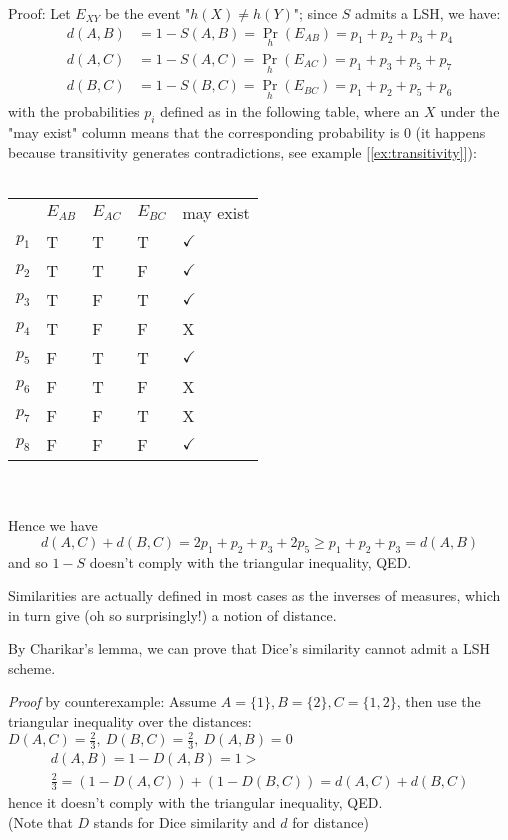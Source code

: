 	\newpage
	Proof: Let $E_{XY}$ be the event "$h(X) \neq h(Y)$"; since $S$ admits a LSH, we have:
	\begin{align*}
		d(A,B) &= 1-S(A,B) = \Pr_h(E_{AB}) = p_1 + p_2 + p_3 + p_4 \\
		d(A,C) &= 1-S(A,C) = \Pr_h(E_{AC}) = p_1 + p_3 + p_5 + p_7 \\
		d(B,C) &= 1-S(B,C) = \Pr_h(E_{BC}) = p_1 + p_2 + p_5 + p_6
	\end{align*}
	with the probabilities $p_i$ defined as in the following table, where an $X$ under the "may exist" column means that the corresponding probability is $0$ (it happens because transitivity generates contradictions, see example [\ref{ex:transitivity}]): \\\\
	\begin{tabular}{lllll}
		& $E_{AB}$ & $E_{AC}$ & $E_{BC}$ & may exist             \\
		$p_1$ & T         & T         & T         & $\checkmark$ \\
		$p_2$ & T         & T         & F         & $\checkmark$ \\
		$p_3$ & T         & F         & T         & $\checkmark$ \\
		$p_4$ & T         & F         & F         & X            \\
		$p_5$ & F         & T         & T         & $\checkmark$ \\
		$p_6$ & F         & T         & F         & X            \\
		$p_7$ & F         & F         & T         & X            \\
		$p_8$ & F         & F         & F         & $\checkmark$
	\end{tabular} \\\\
	Hence we have
	\begin{equation*}
		d(A,C) + d(B,C) = 2p_1 + p_2 + p_3 + 2p_5 \geq p_1 + p_2 + p_3 = d(A,B)
	\end{equation*}
	and so $1-S$ doesn't comply with the triangular inequality, QED.
	
	\obs Similarities are actually defined in most cases as the inverses of measures, which in turn give (oh so surprisingly!) a notion of distance.
	
	\cor By Charikar's lemma, we can prove that Dice's similarity cannot admit a LSH scheme.
	
	\textit{Proof} by counterexample: Assume $A=\{1\}, B=\{2\}, C=\{1, 2\}$, then use the triangular inequality over the distances: \\
	$D(A,C)=\frac{2}{3},\ D(B,C)=\frac{2}{3},\ D(A,B)=0$
	\begin{multline*}
		d(A,B) = 1- D(A,B) = 1 > \\
		\frac{2}{3} = (1-D(A,C)) + (1-D(B,C)) = d(A,C) + d(B,C)
	\end{multline*}
	hence it doesn't comply with the triangular inequality, QED.\\
	(Note that $D$ stands for Dice similarity and $d$ for distance)
	
